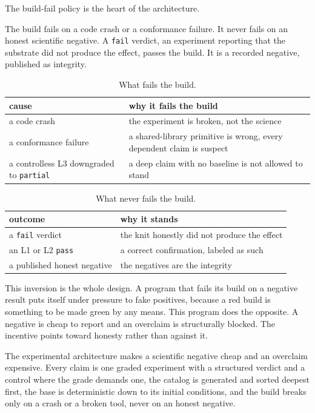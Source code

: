 The build-fail policy is the heart of the architecture.

\begin{principle}
The build fails on a code crash or a conformance failure. It never fails on an honest scientific negative. A \texttt{fail} verdict, an experiment reporting that the substrate did not produce the effect, passes the build. It is a recorded negative, published as integrity.
\end{principle}

\begin{table}[ht]
\centering
\begin{tabular}{@{}ll@{}}
\toprule
cause & why it fails the build \\
\midrule
a code crash & the experiment is broken, not the science \\
a conformance failure & a shared-library primitive is wrong, every dependent claim is suspect \\
a controlless L3 downgraded to \texttt{partial} & a deep claim with no baseline is not allowed to stand \\
\bottomrule
\end{tabular}
\caption{What fails the build.}
\label{tab:fails}
\end{table}

\begin{table}[ht]
\centering
\begin{tabular}{@{}ll@{}}
\toprule
outcome & why it stands \\
\midrule
a \texttt{fail} verdict & the knit honestly did not produce the effect \\
an L1 or L2 \texttt{pass} & a correct confirmation, labeled as such \\
a published honest negative & the negatives are the integrity \\
\bottomrule
\end{tabular}
\caption{What never fails the build.}
\label{tab:passes}
\end{table}

This inversion is the whole design. A program that fails its build on a negative result puts itself under pressure to fake positives, because a red build is something to be made green by any means. This program does the opposite. A negative is cheap to report and an overclaim is structurally blocked. The incentive points toward honesty rather than against it.

\begin{result}
The experimental architecture makes a scientific negative cheap and an overclaim expensive. Every claim is one graded experiment with a structured verdict and a control where the grade demands one, the catalog is generated and sorted deepest first, the base is deterministic down to its initial conditions, and the build breaks only on a crash or a broken tool, never on an honest negative.
\end{result}

